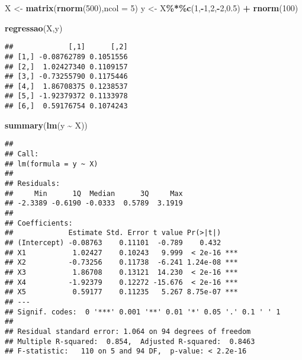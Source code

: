 \documentclass[
]{book}
\newenvironment{Shaded}{\begin{snugshade}}{\end{snugshade}}
\newcommand{\DataTypeTok}[1]{\textcolor[rgb]{0.13,0.29,0.53}{#1}}
\newcommand{\DecValTok}[1]{\textcolor[rgb]{0.00,0.00,0.81}{#1}}
\newcommand{\FloatTok}[1]{\textcolor[rgb]{0.00,0.00,0.81}{#1}}
\newcommand{\KeywordTok}[1]{\textcolor[rgb]{0.13,0.29,0.53}{\textbf{#1}}}
\newcommand{\NormalTok}[1]{#1}
\newcommand{\OperatorTok}[1]{\textcolor[rgb]{0.81,0.36,0.00}{\textbf{#1}}}
\newcommand{\StringTok}[1]{\textcolor[rgb]{0.31,0.60,0.02}{#1}}
\begin{document}
\begin{Shaded}
\begin{Highlighting}[]
\NormalTok{X \textless{}{-}}\StringTok{ }\KeywordTok{matrix}\NormalTok{(}\KeywordTok{rnorm}\NormalTok{(}\DecValTok{500}\NormalTok{),}\DataTypeTok{ncol =} \DecValTok{5}\NormalTok{)}
\NormalTok{y \textless{}{-}}\StringTok{ }\NormalTok{X}\OperatorTok{\%*\%}\KeywordTok{c}\NormalTok{(}\DecValTok{1}\NormalTok{,}\OperatorTok{{-}}\DecValTok{1}\NormalTok{,}\DecValTok{2}\NormalTok{,}\OperatorTok{{-}}\DecValTok{2}\NormalTok{,}\FloatTok{0.5}\NormalTok{) }\OperatorTok{+}\StringTok{ }\KeywordTok{rnorm}\NormalTok{(}\DecValTok{100}\NormalTok{)}

\KeywordTok{regressao}\NormalTok{(X,y)}
\end{Highlighting}
\end{Shaded}

\begin{verbatim}
##             [,1]      [,2]
## [1,] -0.08762789 0.1051556
## [2,]  1.02427340 0.1109157
## [3,] -0.73255790 0.1175446
## [4,]  1.86708375 0.1238537
## [5,] -1.92379372 0.1133978
## [6,]  0.59176754 0.1074243
\end{verbatim}

\begin{Shaded}
\begin{Highlighting}[]
\KeywordTok{summary}\NormalTok{(}\KeywordTok{lm}\NormalTok{(y }\OperatorTok{\textasciitilde{}}\StringTok{ }\NormalTok{X))}
\end{Highlighting}
\end{Shaded}

\begin{verbatim}
## 
## Call:
## lm(formula = y ~ X)
## 
## Residuals:
##     Min      1Q  Median      3Q     Max 
## -2.3389 -0.6190 -0.0333  0.5789  3.1919 
## 
## Coefficients:
##             Estimate Std. Error t value Pr(>|t|)    
## (Intercept) -0.08763    0.11101  -0.789    0.432    
## X1           1.02427    0.10243   9.999  < 2e-16 ***
## X2          -0.73256    0.11738  -6.241 1.24e-08 ***
## X3           1.86708    0.13121  14.230  < 2e-16 ***
## X4          -1.92379    0.12272 -15.676  < 2e-16 ***
## X5           0.59177    0.11235   5.267 8.75e-07 ***
## ---
## Signif. codes:  0 '***' 0.001 '**' 0.01 '*' 0.05 '.' 0.1 ' ' 1
## 
## Residual standard error: 1.064 on 94 degrees of freedom
## Multiple R-squared:  0.854,  Adjusted R-squared:  0.8463 
## F-statistic:   110 on 5 and 94 DF,  p-value: < 2.2e-16
\end{verbatim}
\end{document}

